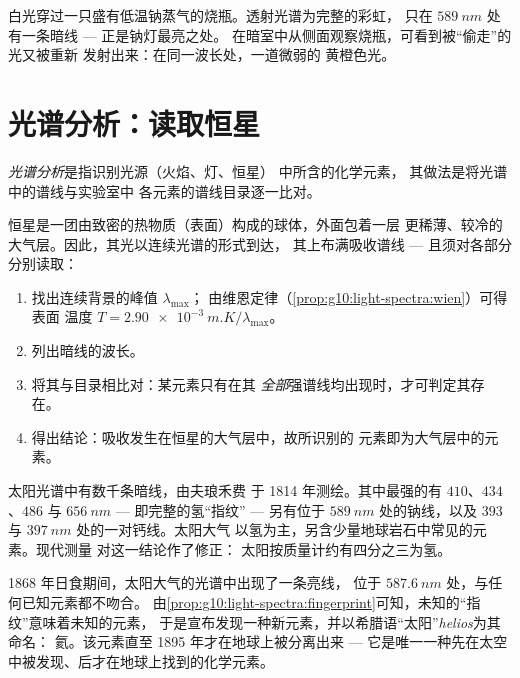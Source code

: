 \begin{example}[盛有钠蒸气的烧瓶]\label{ex:g10:light-spectra:sodiumflask}
白光穿过一只盛有低温钠蒸气的烧瓶。透射光谱为完整的彩虹，
只在 $\qty{589}{nm}$ 处有一条暗线 --- 正是钠灯最亮之处。
在暗室中从侧面观察烧瓶，可看到被“偷走”的光又被重新
发射出来：在同一波长处，一道微弱的
黄橙色光。
\end{example}

\section{光谱分析：读取恒星}

\begin{definition}[光谱分析]\label{def:g10:light-spectra:analysis}
\emph{光谱分析}是指识别光源（火焰、灯、恒星）
中所含的化学元素，
其做法是将光谱中的谱线与实验室中
各元素的谱线目录逐一比对。
\end{definition}

\begin{method}[读取恒星光谱]\label{met:g10:light-spectra:reading}
恒星是一团由致密的热物质（表面）构成的球体，外面包着一层
更稀薄、较冷的大气层。因此，其光以连续光谱的形式到达，
其上布满吸收谱线 --- 且须对各部分分别读取：
\begin{enumerate}
  \item 找出连续背景的峰值 $\lambda_{\max}$；
        由维恩定律（\cref{prop:g10:light-spectra:wien}）可得表面
        温度 $T = \qty{2.90e-3}{m.K} / \lambda_{\max}$。
  \item 列出暗线的波长。
  \item 将其与目录相比对：某元素只有在其
        \emph{全部}强谱线均出现时，才可判定其存在。
  \item 得出结论：吸收发生在恒星的大气层中，故所识别的
        元素即为大气层中的元素。
\end{enumerate}
\end{method}

\begin{example}[太阳的“配方”]\label{ex:g10:light-spectra:sunrecipe}
太阳光谱中有数千条暗线，由夫琅禾费
于 1814 年测绘。其中最强的有 $410$、$434$、$486$ 与 $\qty{656}{nm}$ ---
即完整的氢“指纹” --- 另有位于
$\qty{589}{nm}$ 处的钠线，以及 $393$ 与 $\qty{397}{nm}$ 处的一对钙线。太阳大气
以氢为主，另含少量地球岩石中常见的元素。现代测量
对这一结论作了修正：
太阳按质量计约有四分之三为氢。
\end{example}

\begin{remark}[首先在天空中发现的元素]\label{rem:g10:light-spectra:helium}
1868 年日食期间，太阳大气的光谱中出现了一条亮线，
位于 $\qty{587.6}{nm}$ 处，与任何已知元素都不吻合。
由\cref{prop:g10:light-spectra:fingerprint}可知，未知的“指纹”意味着未知的元素，
于是宣布发现一种新元素，并以希腊语“太阳”\emph{helios}为其命名：
氦。该元素直至 1895 年才在地球上被分离出来 ---
它是唯一一种先在太空中被发现、后才在地球上找到的化学元素。
\end{remark}

